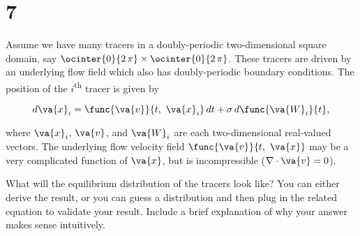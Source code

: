 \section{7}

Assume we have many tracers in a doubly-periodic two-dimensional square domain, say $\ocinter{0}{2\,\pi} \times \ocinter{0}{2\,\pi}$. These tracers are driven by an underlying flow field which also has doubly-periodic boundary conditions. The position of the $i$\textsuperscript{th} tracer is given by

\begin{equation}
	d\va{x}_i = \func{\va{v}}{t,\ \va{x}_i}\,dt + \sigma\,d\func{\va{W}_i}{t},
\end{equation}

where $\va{x}_{i}$, $\va{v}$, and $\va{W}_{i}$ are each two-dimensional real-valued vectors. The underlying flow velocity field $\func{\va{v}}{t,\ \va{x}}$ may be a very complicated function of $\va{x}$, but is incompressible ($\nabla \cdot \va{v} = 0$).

What will the equilibrium distribution of the tracers look like? You can either derive the result, or you can guess a distribution and then plug in the related equation to validate your result. Include a brief explanation of why your answer makes sense intuitively.

